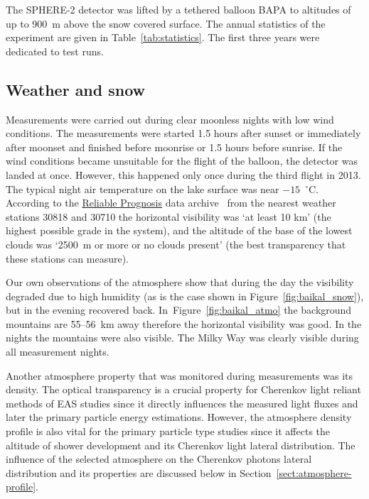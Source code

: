 \documentclass[universe,article,submit,moreauthors,pdftex]{Definitions/mdpi}
\begin{document}
The \mbox{SPHERE-2} detector was lifted by a tethered balloon BAPA to altitudes of up to 900~m above the snow covered surface. The annual statistics of the experiment are given in Table~\ref{tab:statistics}. The first three years were dedicated to test runs. 


\subsection{Weather and snow}

Measurements were carried out during clear moonless nights with low wind conditions. The measurements were started 1.5 hours after sunset or immediately after moonset and finished before moonrise or 1.5 hours before sunrise. If the wind conditions became unsuitable for the flight of the balloon, the detector was landed at once. However, this happened only once during the third flight in 2013. The typical night air temperature on the lake surface was near $-15$~$^\circ$C. According to the \href{https://rp5.ru/Weather_in_the_world}{Reliable Prognosis} data archive~\cite{rp5} from the nearest weather stations 30818 and 30710 the horizontal visibility was `at least 10 km' (the highest possible grade in the system), and the altitude of the base of the lowest clouds was `2500~m or more or no clouds present' (the best transparency that these stations can measure).

Our own observations of the atmosphere show that during the day the visibility degraded due to high humidity (as is the case shown in Figure~\ref{fig:baikal_snow}), but in the evening recovered back. In~Figure~\ref{fig:baikal_atmo} the background mountains are 55--56~km away therefore the horizontal visibility was good. In the nights the mountains were also visible. The Milky Way was clearly visible during all measurement nights. 

Another atmosphere property that was monitored during measurements was its density. The optical transparency is a crucial property for Cherenkov light reliant methods of EAS studies since it directly influences the measured light fluxes and later the primary particle energy estimations. However, the atmosphere density profile is also vital for the primary particle type studies since it affects the altitude of shower development and its Cherenkov light lateral distribution. The influence of the selected atmosphere on the Cherenkov photons lateral distribution and its properties are discussed below in Section~\ref{sect:atmosphere-profile}.
\end{document}
